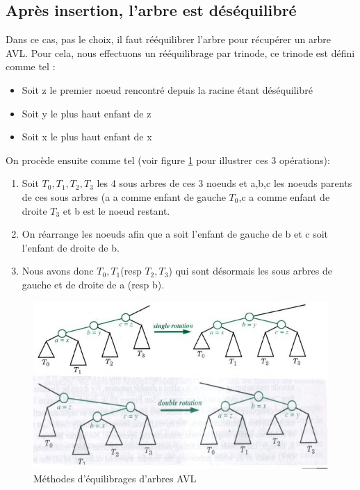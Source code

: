 \documentclass[10pt,a4paper]{article}
\begin{document}
\subsection*{Après insertion, l'arbre est déséquilibré}
Dans ce cas, pas le choix, il faut rééquilibrer l'arbre pour récupérer un arbre AVL. Pour cela, nous effectuons un rééquilibrage par trinode, ce trinode est défini comme tel :
\begin{itemize}
\item Soit z le premier noeud rencontré depuis la racine étant déséquilibré
\item Soit y le plus haut enfant de z
\item Soit x le plus haut enfant de x
\end{itemize}
On procède ensuite comme tel (voir figure \ref{avleq} pour illustrer ces 3 opérations):
\begin{enumerate}

\item Soit $T_0,T_1,T_2,T_3$ les 4 sous arbres de ces 3 noeuds et a,b,c les noeuds parents de ces sous arbres (a a comme enfant de gauche $T_0$,c a comme enfant de droite $T_3$ et b est le noeud restant.
\item On réarrange les noeuds afin que a soit l'enfant de gauche de b et c soit l'enfant de droite de b.
\item Nous avons donc $T_0,T_1$(resp $T_2,T_3$) qui sont désormais les sous arbres de gauche et de droite de a (resp b).
\end{enumerate}
\begin{figure}[!h]
\centering
\includegraphics[scale=0.7]{equilibrage.jpg}
\caption{Méthodes d'équilibrages d'arbres AVL}
\label{avleq}
\end{figure}
\end{document}
